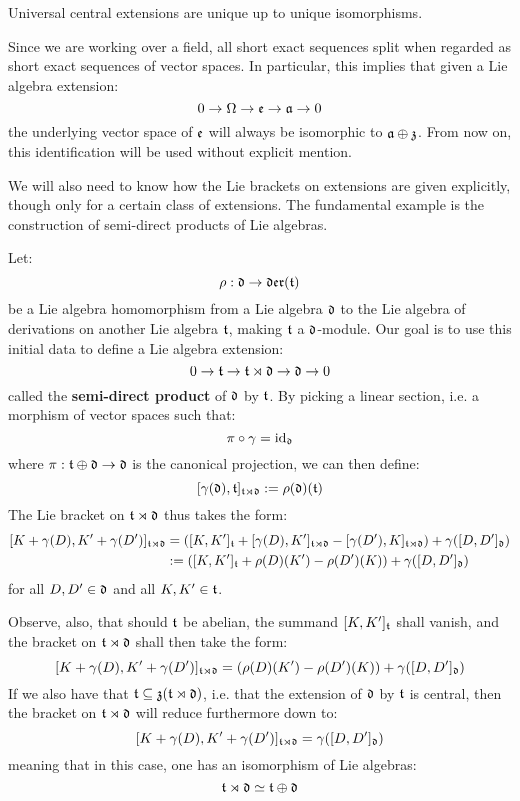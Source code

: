         \begin{remark}
            Universal central extensions are unique up to unique isomorphisms. 
        \end{remark}
        \begin{remark}
            Since we are working over a field, all short exact sequences split when regarded as short exact sequences of vector spaces. In particular, this implies that given a Lie algebra extension:
                $$0 \to \Omega \to \mathfrak{e} \to \mathfrak{a} \to 0$$
            the underlying vector space of $\mathfrak{e}$ will always be isomorphic to $\mathfrak{a} \oplus \mathfrak{z}$. From now on, this identification will be used without explicit mention.
        \end{remark}
        We will also need to know how the Lie brackets on extensions are given explicitly, though only for a certain class of extensions. The fundamental example is the construction of semi-direct products of Lie algebras.
        \begin{example} \label{example: lie_algebra_semi_direct_products}
            Let:
                $$\rho: \mathfrak{d} \to \mathfrak{der}(\mathfrak{t})$$
            be a Lie algebra homomorphism from a Lie algebra $\mathfrak{d}$ to the Lie algebra of derivations on another Lie algebra $\mathfrak{t}$, making $\mathfrak{t}$ a $\mathfrak{d}$-module. Our goal is to use this initial data to define a Lie algebra extension:
                $$0 \to \mathfrak{t} \to \mathfrak{t} \rtimes \mathfrak{d} \to \mathfrak{d} \to 0$$
            called the \textbf{semi-direct product} of $\mathfrak{d}$ by $\mathfrak{t}$. By picking a linear section, i.e. a morphism of vector spaces such that:
                $$\pi \circ \gamma = \mathrm{id}_{\mathfrak{d}}$$
            where $\pi: \mathfrak{t} \oplus \mathfrak{d} \to \mathfrak{d}$ is the canonical projection, we can then define:
                $$[\gamma(\mathfrak{d}), \mathfrak{t}]_{\mathfrak{t} \rtimes \mathfrak{d}} := \rho(\mathfrak{d})(\mathfrak{t})$$
            The Lie bracket on $\mathfrak{t} \rtimes \mathfrak{d}$ thus takes the form:
                $$
                    \begin{aligned}
                        [ K + \gamma(D), K' + \gamma(D') ]_{\t \rtimes \d} & = ( [K, K']_{\t} + [\gamma(D), K']_{\t \rtimes \d} - [\gamma(D'), K]_{\t \rtimes \d} ) + \gamma( [D, D']_{\d} )
                        \\
                        & := ( [K, K']_{\t} + \rho(D)(K') - \rho(D')(K) ) + \gamma( [D, D']_{\d} )
                    \end{aligned}
                $$
            for all $D, D' \in \mathfrak{d}$ and all $K, K' \in \mathfrak{t}$.

            Observe, also, that should $\mathfrak{t}$ be abelian, the summand $[K, K']_{\mathfrak{t}}$ shall vanish, and the bracket on $\mathfrak{t} \rtimes \mathfrak{d}$ shall then take the form:
                $$[ K + \gamma(D), K' + \gamma(D') ]_{\mathfrak{t} \rtimes \mathfrak{d}} = ( \rho(D)(K') - \rho(D')(K) ) + \gamma( [D, D']_{\mathfrak{d}} )$$
            If we also have that $\mathfrak{t} \subseteq \mathfrak{z}( \mathfrak{t} \rtimes \mathfrak{d} )$, i.e. that the extension of $\mathfrak{d}$ by $\mathfrak{t}$ is central, then the bracket on $\mathfrak{t} \rtimes \mathfrak{d}$ will reduce furthermore down to:
                $$[ K + \gamma(D), K' + \gamma(D') ]_{\mathfrak{t} \rtimes \mathfrak{d}} = \gamma( [D, D']_{\mathfrak{d}} )$$
            meaning that in this case, one has an isomorphism of Lie algebras:
                $$\mathfrak{t} \rtimes \mathfrak{d} \simeq \mathfrak{t} \oplus \mathfrak{d}$$
        \end{example}
